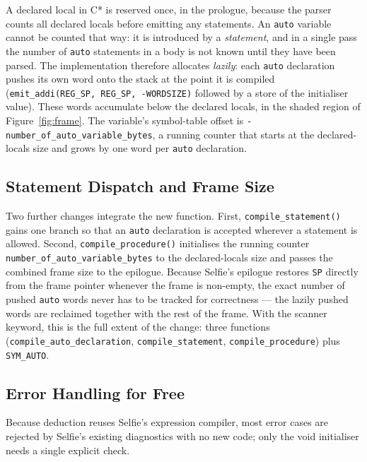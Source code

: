 \documentclass[a4paper,11pt]{article}
\begin{document}
A declared local in C* is reserved once, in the prologue, because the parser counts all declared locals before emitting any statements. An \texttt{auto} variable cannot be counted that way: it is introduced by a \emph{statement}, and in a single pass the number of \texttt{auto} statements in a body is not known until they have been parsed. The implementation therefore allocates \emph{lazily}: each \texttt{auto} declaration pushes its own word onto the stack at the point it is compiled (\texttt{emit\_addi(REG\_SP, REG\_SP, -WORDSIZE)} followed by a store of the initialiser value). These words accumulate below the declared locals, in the shaded region of Figure~\ref{fig:frame}. The variable's symbol-table offset is \texttt{-number\_of\_auto\_variable\_bytes}, a running counter that starts at the declared-locals size and grows by one word per \texttt{auto} declaration.

\subsection{Statement Dispatch and Frame Size}
\label{sec:dispatch}

Two further changes integrate the new function. First, \texttt{compile\_statement()} gains one branch so that an \texttt{auto} declaration is accepted wherever a statement is allowed. Second, \texttt{compile\_procedure()} initialises the running counter \texttt{number\_of\_auto\_variable\_bytes} to the declared-locals size and passes the combined frame size to the epilogue. Because Selfie's epilogue restores \texttt{SP} directly from the frame pointer whenever the frame is non-empty, the exact number of pushed \texttt{auto} words never has to be tracked for correctness --- the lazily pushed words are reclaimed together with the rest of the frame. With the scanner keyword, this is the full extent of the change: three functions (\texttt{compile\_auto\_declaration}, \texttt{compile\_statement}, \texttt{compile\_procedure}) plus \texttt{SYM\_AUTO}.

\subsection{Error Handling for Free}
\label{sec:errors}

Because deduction reuses Selfie's expression compiler, most error cases are rejected by Selfie's existing diagnostics with no new code; only the void initialiser needs a single explicit check.
\end{document}

